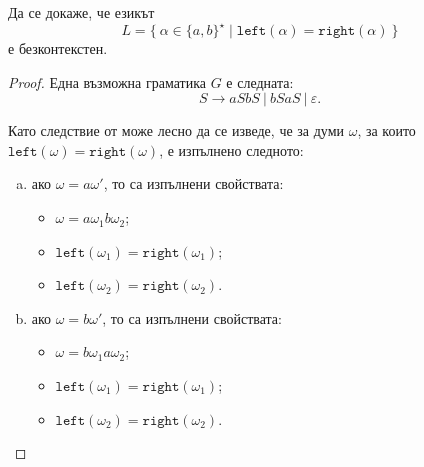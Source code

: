 \begin{framed}
  \begin{problem}
    Да се докаже, че езикът 
    \[L = \{\ \alpha \in \{a,b\}^\star\mid \texttt{left}(\alpha) = \texttt{right}(\alpha)\ \}\]
    е безконтекстен.
  \end{problem}  
\end{framed}
\begin{proof}
  Една възможна граматика $G$ е следната: 
  \[S \to a  S b S\ |\ b S a S\ |\ \varepsilon.\]
  
  Като следствие от  може лесно да се изведе, че за думи $\omega$, за които $\texttt{left}(\omega) = \texttt{right}(\omega)$,
  е изпълнено следното:
  \begin{enumerate}[a)]
  \item 
    ако $\omega = a\omega'$, то са изпълнени свойствата:
    \begin{itemize}
    \item 
      $\omega = a \omega_1 b \omega_2$;
    \item
      $\texttt{left}(\omega_1) = \texttt{right}(\omega_1)$;
    \item
      $\texttt{left}(\omega_2) = \texttt{right}(\omega_2)$.
    \end{itemize}
  \item
    ако $\omega = b \omega'$, то са изпълнени свойствата:
    \begin{itemize}
    \item 
      $\omega = b \omega_1 a \omega_2$;
    \item
      $\texttt{left}(\omega_1) = \texttt{right}(\omega_1)$;
    \item
      $\texttt{left}(\omega_2) = \texttt{right}(\omega_2)$.
    \end{itemize}
  \end{enumerate}


\end{proof}
